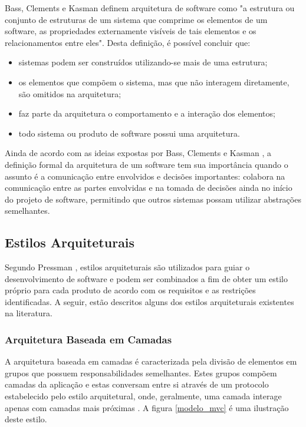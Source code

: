 Bass, Clements e Kasman \cite{bass_software_archi_practice_2003} definem arquitetura de software como "a estrutura ou conjunto de estruturas de um sistema que comprime os elementos de um software, as propriedades externamente visíveis de tais elementos e os relacionamentos entre eles". Desta definição, é possível concluir que:
\begin{itemize}
\item sistemas podem ser construídos utilizando-se mais de uma estrutura;
\item os elementos que compõem o sistema, mas que não interagem diretamente, são omitidos na arquitetura;
\item faz parte da arquitetura o comportamento e a interação dos elementos;
\item todo sistema ou produto de software possui uma arquitetura.
\end{itemize}

Ainda de acordo com as ideias expostas por Bass, Clements e Kasman \cite{bass_software_archi_practice_2003}, a definição formal da arquitetura de um software tem sua importância quando o assunto é a comunicação entre envolvidos e decisões importantes: colabora na comunicação entre as partes envolvidas e na tomada de decisões ainda no início do projeto de software, permitindo que outros sistemas possam utilizar abstrações semelhantes.

\subsection{Estilos Arquiteturais}
Segundo Pressman \cite{pressman2006engenharia}, estilos arquiteturais são utilizados para guiar o desenvolvimento de software e podem ser combinados a fim de obter um estilo próprio para cada produto de acordo com os requisitos e as restrições identificadas. A seguir, estão descritos alguns dos estilos arquiteturais existentes na literatura.

\subsubsection{Arquitetura Baseada em Camadas}
A arquitetura baseada em camadas é caracterizada pela divisão de elementos em grupos que possuem responsabilidades semelhantes. Estes grupos compõem camadas da aplicação e estas conversam entre si através de um protocolo estabelecido pelo estilo arquitetural, onde, geralmente, uma camada interage apenas com camadas mais próximas \cite{pressman2006engenharia}. A figura \ref{modelo_mvc} é uma ilustração deste estilo.

